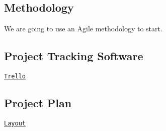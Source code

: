 \subsection*{Methodology}

We are going to use an Agile methodology to start.

\subsection*{Project Tracking Software}

\href{https://trello.com/aqiq}{\tt Trello}

\subsection*{Project Plan}

\href{https://trello.com/b/DfhxuGFe/project-plan}{\tt Layout} 